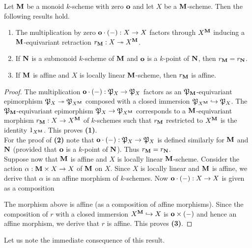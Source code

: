 \begin{proposition}\label{proposition:retraction_for_monoids_with_zero}
Let $\mathbf{M}$ be a monoid $k$-scheme with zero $\mathbf{o}$ and let $X$ be a $\mathbf{M}$-scheme. Then the following results hold.
\begin{enumerate}[label=\emph{\textbf{(\arabic*)}}, leftmargin=1.5em]
\item The multiplication by zero $\mathbf{o}\cdot(-):X\rightarrow X$ factors through $X^{\mathbf{M}}$ inducing a $\mathbf{M}$-equivariant retraction $r_{\mathbf{M}}:X\twoheadrightarrow X^{\mathbf{M}}$.
\item If $\mathbf{N}$ is a submonoid $k$-scheme of $\mathbf{M}$ and $\mathbf{o}$ is a $k$-point of $\mathbf{N}$, then $r_{\mathbf{M}} = r_{\mathbf{N}}$.
\item If $\mathbf{M}$ is affine and $X$ is locally linear $\mathbf{M}$-scheme, then $r_{\mathbf{M}}$ is affine.
\end{enumerate}
\end{proposition}
\begin{proof}
The multiplication $\mathbf{o}\cdot (-):{\mathfrak P}_X\rightarrow {\mathfrak P}_X$ factors as an ${\mathfrak P}_{\mathbf{M}}$-equivariant epimorphism ${\mathfrak P}_X\twoheadrightarrow {\mathfrak P}_{X^{\mathbf{M}}}$ composed with a closed immersion ${\mathfrak P}_{X^{\mathbf{M}}}\hookrightarrow {\mathfrak P}_X$. The ${\mathfrak P}_{\mathbf{M}}$-equivariant epimorphism ${\mathfrak P}_X\rightarrow {\mathfrak P}_{X^{\mathbf{M}}}$ corresponds to a $\mathbf{M}$-equivariant morphism $r_{\mathbf{M}}:X\rightarrow X^{\mathbf{M}}$ of $k$-schemes such that $r_{\mathbf{M}}$ restricted to $X^{\mathbf{M}}$ is the identity $1_{X^{\mathbf{M}}}$. This proves \textbf{(1)}.\\
For the proof of \textbf{(2)} note that $\mathbf{o}\cdot (-):{\mathfrak P}_X\rightarrow {\mathfrak P}_X$ is defined similarly for $\mathbf{M}$ and $\mathbf{N}$ (provided that $\mathbf{o}$ is a $k$-point of $\mathbf{N}$). Thus $r_{\mathbf{M}} = r_{\mathbf{N}}$.\\
Suppose now that $\mathbf{M}$ is affine and $X$ is locally linear $\mathbf{M}$-scheme. Consider the action $\alpha:\mathbf{M}\times X\rightarrow X$ of $\mathbf{M}$ on $X$. Since $X$ is locally linear and $\mathbf{M}$ is affine, we derive that $\alpha$ is an affine morphism of $k$-schemes. Now $\mathbf{o}\cdot (-):X\rightarrow X$ is given as a composition 
\begin{center}
\end{center}
The morphism above is affine (as a composition of affine morphisms). Since the composition of $r$ with a closed immersion $X^{\mathbf{M}}\hookrightarrow X$ is $\mathbf{o}\times(-)$ and hence an affine morphism, we derive that $r$ is affine. This proves \textbf{(3)}.
\end{proof}
\noindent
Let us note the immediate consequence of this result.

